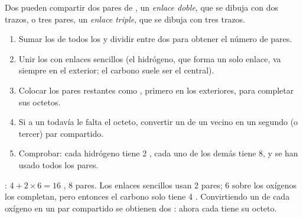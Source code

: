 \begin{definition}\label{def:g10:lewis-and-shape:multiple-bond}
Dos  pueden compartir dos pares de , un
\emph{enlace doble}, que se dibuja con dos trazos, o
tres pares, un \emph{enlace triple}, que se dibuja
con tres trazos.
\end{definition}

\begin{method}\label{met:g10:lewis-and-shape:draw}
\begin{enumerate}
  \item Sumar los  de todos los  y dividir
        entre dos para obtener el número de pares.
  \item Unir los  con enlaces sencillos (el hidrógeno, que forma
        un solo enlace, va siempre en el exterior; el carbono suele ser
        el  central).
  \item Colocar los pares restantes como , primero en
        los  exteriores, para completar sus octetos.
  \item Si a un  todavía le falta el octeto, convertir un  de un vecino en un segundo (o tercer) par compartido.
  \item Comprobar: cada hidrógeno tiene 2 , cada uno de los
        demás  tiene 8, y se han usado todos los pares.
\end{enumerate}
\end{method}

\begin{example}\label{ex:g10:lewis-and-shape:co2}
: $4 + 2 \times 6 = 16$ , 8 pares. Los
enlaces sencillos  usan 2 pares; 6  sobre
los oxígenos los completan, pero entonces el carbono solo tiene 4
. Convirtiendo un  de cada oxígeno en un par
compartido se obtienen dos : ahora cada  tiene su
octeto.
\end{example}

